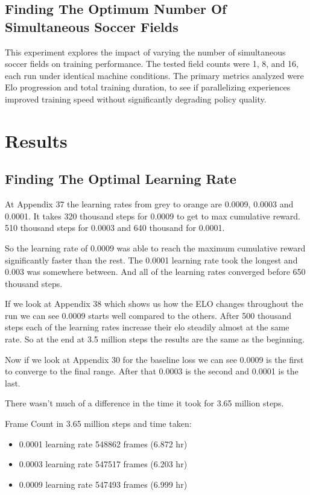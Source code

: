 \documentclass{LSkill}
\begin{document}
\subsection{Finding The Optimum Number Of Simultaneous Soccer Fields}
\label{subsec:fields-exp}
This experiment explores the impact of varying the number of simultaneous soccer fields on training performance. The tested field counts were 1, 8, and 16, each run under identical machine conditions. The primary metrics analyzed were Elo progression and total training duration, to see if parallelizing experiences improved training speed without significantly degrading policy quality.


\section{Results}
\label{sec:results}
\subsection{Finding The Optimal Learning Rate}
At Appendix 37 the learning rates from grey to orange are 0.0009, 0.0003 and 0.0001. It takes 320 thousand steps for 0.0009 to get to max cumulative reward. 510 thousand steps for 0.0003 and 640 thousand for 0.0001.
\vspace{0.4cm}

So the learning rate of 0.0009 was able to reach the maximum cumulative reward significantly faster than the rest. The 0.0001 learning rate took the longest and 0.003 was somewhere between. And all of the learning rates converged before 650 thousand steps.

If we look at Appendix 38 which shows us how the ELO changes throughout the run we can see 0.0009 starts well compared to the others. After 500 thousand steps each of the learning rates increase their elo steadily almost at the same rate. So at the end at 3.5 million steps the results are the same as the beginning.

Now if we look at Appendix 30 for the baseline loss we can see 0.0009 is the first to converge to the final range. After that 0.0003 is the second and 0.0001 is the last.

There wasn’t much of a difference in the time it took for 3.65 million steps. 

Frame Count in 3.65 million steps and time taken:

\begin{itemize}
    \item 0.0001 learning rate 548862 frames (6.872 hr)
    \item 0.0003 learning rate 547517 frames (6.203 hr)
    \item 0.0009 learning rate 547493 frames (6.999 hr)
\end{itemize}
\end{document}
